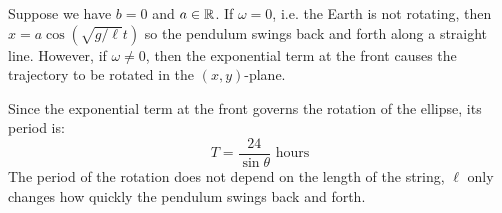 \documentclass[../main.tex]{subfiles}
\begin{document}
Suppose we have $b = 0$ and $a \in \mathbb{R}$.
If $\omega = 0$, i.e. the Earth is not rotating, then $x = a \cos(\sqrt{g/\ell}t)$ so the pendulum swings back and forth along a straight line.
However, if $\omega \neq 0$, then the exponential term at the front causes the trajectory to be rotated in the $(x, y)$-plane.

Since the exponential term at the front governs the rotation of the ellipse, its period is:
\[
  T = \frac{24}{\sin \theta} \text{ hours}
\]
The period of the rotation does not depend on the length of the string, $\ell$ only changes how quickly the pendulum swings back and forth.
\end{document}
